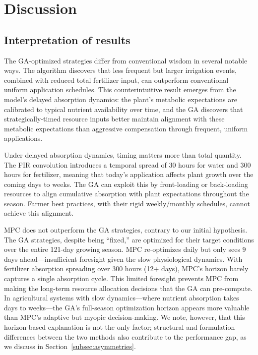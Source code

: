 \documentclass[pdflatex,sn-mathphys-num]{sn-jnl}
\begin{document}
\section{Discussion}\label{sec:discussion}

\subsection{Interpretation of results}\label{subsec:interpretation}

The GA-optimized strategies differ from conventional wisdom in several notable ways. The algorithm discovers that less frequent but larger irrigation events, combined with reduced total fertilizer input, can outperform conventional uniform application schedules. This counterintuitive result emerges from the model's delayed absorption dynamics: the plant's metabolic expectations are calibrated to typical nutrient availability over time, and the GA discovers that strategically-timed resource inputs better maintain alignment with these metabolic expectations than aggressive compensation through frequent, uniform applications.

Under delayed absorption dynamics, timing matters more than total quantity. The FIR convolution introduces a temporal spread of 30 hours for water and 300 hours for fertilizer, meaning that today's application affects plant growth over the coming days to weeks. The GA can exploit this by front-loading or back-loading resources to align cumulative absorption with plant expectations throughout the season. Farmer best practices, with their rigid weekly/monthly schedules, cannot achieve this alignment.

MPC does not outperform the GA strategies, contrary to our initial hypothesis. The GA strategies, despite being ``fixed,'' are optimized for their target conditions over the entire 121-day growing season. MPC re-optimizes daily but only sees 9 days ahead---insufficient foresight given the slow physiological dynamics. With fertilizer absorption spreading over 300 hours (12+ days), MPC's horizon barely captures a single absorption cycle. This limited foresight prevents MPC from making the long-term resource allocation decisions that the GA can pre-compute. In agricultural systems with slow dynamics---where nutrient absorption takes days to weeks---the GA's full-season optimization horizon appears more valuable than MPC's adaptive but myopic decision-making. We note, however, that this horizon-based explanation is not the only factor; structural and formulation differences between the two methods also contribute to the performance gap, as we discuss in Section~\ref{subsec:asymmetries}.
\end{document}
